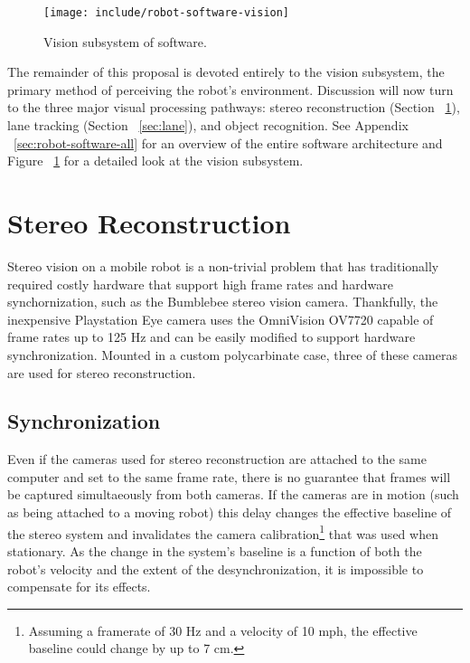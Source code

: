 \documentclass[11pt,twocolumn]{article}
\begin{document}
\begin{figure}
	\centering
	\texttt{[image: include/robot-software-vision]}
	\caption{Vision subsystem of software.}
	\label{fig:robot-software-vision}
\end{figure}

The remainder of this proposal is devoted entirely to the vision subsystem, the
primary method of perceiving the robot’s environment. Discussion will now turn
to the three major visual processing pathways: stereo reconstruction (Section
~\ref{sec:stereo}), lane tracking (Section ~\ref{sec:lane}), and object
recognition. See Appendix ~\ref{sec:robot-software-all} for an overview of the
entire software architecture and Figure ~\ref{fig:robot-software-vision} for a
detailed look at the vision subsystem.


\section{Stereo Reconstruction}
\label{sec:stereo}
Stereo vision on a mobile robot is a non-trivial problem that has traditionally
required costly hardware that support high frame rates and hardware
synchornization, such as the Bumblebee stereo vision camera. Thankfully, the
inexpensive Playstation Eye camera uses the OmniVision OV7720 capable of frame
rates up to 125 Hz and can be easily modified to support hardware
synchronization. Mounted in a custom polycarbinate case, three of these cameras
are used for stereo reconstruction.

\subsection{Synchronization}
\label{sec:stereo-sync}
Even if the cameras used for stereo reconstruction are attached to the same
computer and set to the same frame rate, there is no guarantee that frames will
be captured simultaeously from both cameras. If the cameras are in motion (such
as being attached to a moving robot) this delay changes the effective baseline
of the stereo system and invalidates the camera calibration\footnote{Assuming a
framerate of 30 Hz and a velocity of 10 mph, the effective baseline could change
by up to 7 cm.} that was used when stationary. As the change in the system's
baseline is a function of both the robot's velocity and the extent of the
desynchronization, it is impossible to compensate for its effects.
\end{document}
